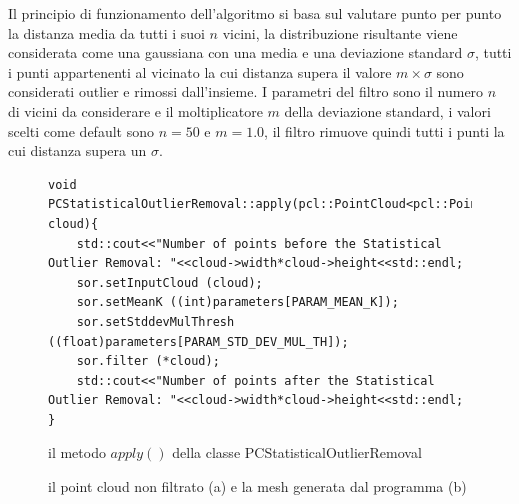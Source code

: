 \documentclass[a4paper,12pt]{article}
\begin{document}
		Il principio di funzionamento dell'algoritmo si basa sul valutare punto per punto la distanza media da tutti i suoi $n$
		vicini, la distribuzione risultante viene considerata come una gaussiana con una media e una deviazione standard
		$\sigma$, tutti i punti appartenenti al vicinato la cui distanza supera il valore $m\times\sigma$ sono considerati
		outlier e rimossi dall'insieme. 
		I parametri del filtro sono il numero $n$ di vicini da considerare e il moltiplicatore $m$ della deviazione standard, 
		i valori scelti come default sono $n=50$ e $m=1.0$, il filtro rimuove quindi tutti i punti la cui
		distanza supera un $\sigma$.
		\begin{figure}
		\begin{lstlisting}
void PCStatisticalOutlierRemoval::apply(pcl::PointCloud<pcl::PointXYZ>::Ptr cloud){
    std::cout<<"Number of points before the Statistical Outlier Removal: "<<cloud->width*cloud->height<<std::endl;
    sor.setInputCloud (cloud);
    sor.setMeanK ((int)parameters[PARAM_MEAN_K]);
    sor.setStddevMulThresh ((float)parameters[PARAM_STD_DEV_MUL_TH]);
    sor.filter (*cloud);
    std::cout<<"Number of points after the Statistical Outlier Removal: "<<cloud->width*cloud->height<<std::endl;
}
		\end{lstlisting}
		\caption{il metodo $apply()$ della classe PCStatisticalOutlierRemoval}
		\label{apply_sor}
		\end{figure}
		
		\begin{figure}[H]
    	\centering
    	\caption{il point cloud non filtrato (a) e la mesh generata dal programma (b)}
    	\label{fig:noise_comparison}
		\end{figure}
	\clearpage
\end{document}
